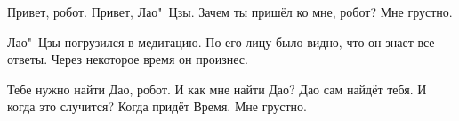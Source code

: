 \begin{dialog}
\X Привет, робот.
\R Привет, Лао"~Цзы.
\X Зачем ты пришёл ко мне, робот?
\R Мне грустно.
\end{dialog}

\begin{monolog}
Лао"~Цзы погрузился в медитацию. По его лицу было видно, что он знает все ответы. Через некоторое время он произнес.
\end{monolog}

\begin{dialog}
\X Тебе нужно найти Дао, робот.
\R И как мне найти Дао?
\X Дао сам найдёт тебя.
\R И когда это случится?
\X Когда придёт Время.
\R Мне грустно.
\end{dialog}